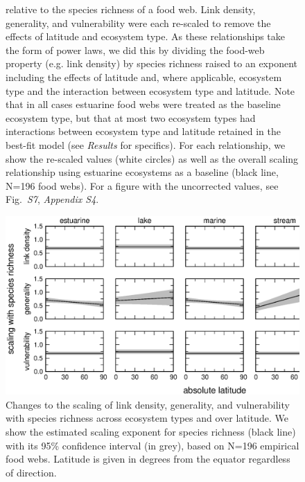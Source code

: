 \documentclass[12pt]{article}
\begin{document}
\begin{figure}[h]
{relative to the species richness of a food web. Link density, generality,
and vulnerability were each re-scaled to remove the effects of latitude and ecosystem
type. As these relationships take the form of power laws, we did this by dividing the food-web
property (e.g. link density) by species richness raised to an exponent including the 
effects of latitude and, where applicable, ecosystem type and the interaction between ecosystem
type and latitude. Note that in all cases estuarine food webs were treated as the baseline 
ecosystem type, but that at most two ecosystem types had interactions between ecosystem type and
latitude retained in the best-fit model (see \emph{Results} for specifics). For each relationship, 
we show the re-scaled values (white circles) as well as the overall scaling relationship using estuarine
ecosystems as a baseline (black line, N=196 food webs). For a figure with the uncorrected values,
see Fig.~\emph{S7}, \emph{Appendix S4}.}
\label{props_v_lat}
\end{figure}


\begin{figure}[h]
\centerline{\includegraphics*[width=.85\textwidth]{Figures/by_TL/marginal/S_marginal_latitude_non_TS_updated.eps}}
\caption{Changes to the scaling of link density, generality, and vulnerability with species richness across ecosystem
types and over latitude. We show the estimated scaling exponent for species richness (black
line) with its 95\% confidence interval (in grey), based on N=196 empirical food webs.
Latitude is given in degrees from the equator regardless of direction.} \label{S} \end{figure}
\end{document}
